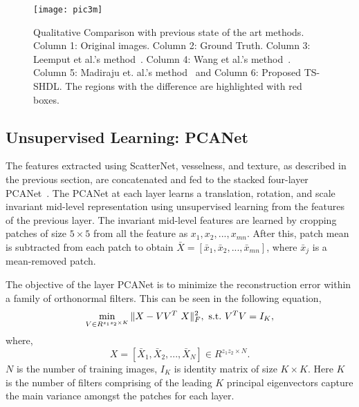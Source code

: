 \documentclass[10pt,twocolumn,letterpaper]{article}
\begin{document}
\begin{figure*}[t!]
	\centering
	\texttt{[image: pic3m]}
	\caption{Qualitative Comparison with previous state of the art methods.
	 Column 1: Original images. Column 2:  Ground Truth. Column 3: Leemput et al.'s method~\cite{van1999automated}. Column 4: Wang et al.'s method~\cite{wang2009active}. Column 5: Madiraju et. al.'s method~\cite{madiraju2016level} and Column 6: Proposed TS-SHDL. The regions with the difference are highlighted with red boxes.}
	\label{fig:compare}
\end{figure*}

\subsection{Unsupervised Learning: PCANet}
\label{PCA}
The features extracted using ScatterNet, vesselness, and texture, as described in the previous section, are concatenated and fed to the stacked four-layer PCANet~\cite{pcanet}. The PCANet at each layer learns a translation, rotation, and scale invariant mid-level representation using unsupervised learning from the features of the previous layer. The invariant mid-level features are learned by cropping patches of size $5 \times 5$ from all the feature as $ x_{1}, x_{2},..., x_{mn}$. After this, patch mean is subtracted from each patch to obtain  $\bar{ X} = [\bar{  x}_{1},\bar{ x}_{2},...,\bar{x}_{mn}]$, where $\bar{ x}_{j}$ is a mean-removed patch.

The objective of the layer PCANet is to minimize the reconstruction error within a family of orthonormal filters. This can be seen in the following equation, 
\begin{equation}
\min_{ V\in R^{z_1z_2 \times K}} \| X -  V V^T\ X\|_F^2,~{\rm s.t.}~  V^T V =   I_{K},
\end{equation} 
where,
\begin{equation}\label{eq: datamatrix_1}
 X = [\bar{ X}_1,\bar{ X}_2,...,\bar{ X}_N]\in {R}^{z_1z_2 \times N}.
\end{equation}
$N$ is the number of training images, $ I_{K}$ is identity matrix of size $K\times K$. Here $K$ is the number of filters comprising of the leading $K$ principal eigenvectors capture the main variance amongst the patches for each layer. 
\end{document}
